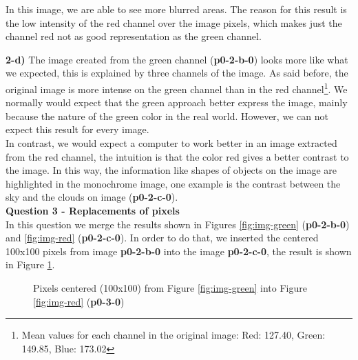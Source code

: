 \documentclass[12pt,a4paper]{article}
\begin{document}
In this image, we are able to see more blurred areas. The reason for this result is the low intensity of the red channel over the image pixels, which makes just the channel red not as good representation as the green channel.

\textbf{2-d) } The image created from the green channel (\textbf{p0-2-b-0}) looks more like what we expected, this is explained by three channels of the image. As said before, the original image is more intense on the green channel than in the red channel\footnote{Mean values for each channel in the original image: Red: 127.40, Green: 149.85, Blue: 173.02}. We normally would expect that the green approach better express the image, mainly because the nature of the green color in the real world. However, we can not expect this result for every image. \\

In contrast, we would expect a computer to work better in an image extracted from the red channel, the intuition is that the color red gives a better contrast to the image. In this way, the information like shapes of objects on the image are highlighted in the monochrome image, one example is the contrast between the sky and the clouds on image (\textbf{p0-2-c-0}). \\

\textbf{Question 3 - Replacements of pixels} \\

In this question we merge the results shown in Figures \ref{fig:img-green} (\textbf{p0-2-b-0}) and \ref{fig:img-red} (\textbf{p0-2-c-0}). In order to do that, we inserted the centered 100x100 pixels from image \textbf{p0-2-b-0} into the image \textbf{p0-2-c-0}, the result is shown in Figure \ref{fig:p0-3-0}. 


\begin{figure}[!h]
	\centering
	{%
		\setlength{\fboxsep}{1pt}%
		\setlength{\fboxrule}{1pt}%
	}%
	\caption{Pixels centered (100x100) from Figure \ref{fig:img-green} into Figure \ref{fig:img-red} (\textbf{p0-3-0})}
	\label{fig:p0-3-0}
\end{figure}
\end{document}

